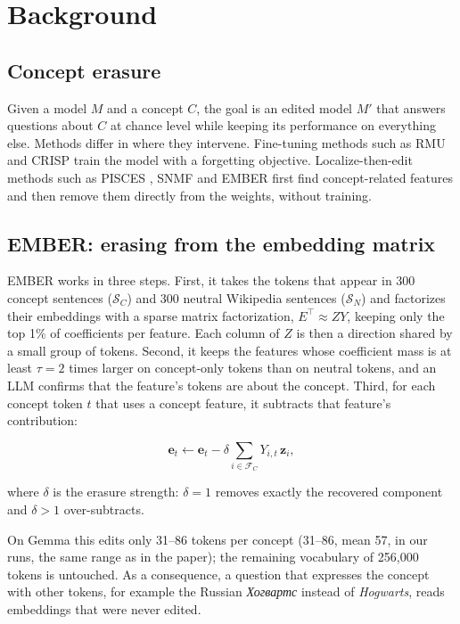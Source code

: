\documentclass[11pt]{article}
\newcommand{\cyr}[1]{{\fontencoding{T2A}\fontfamily{cmr}\selectfont #1}}
\begin{document}
\section{Background}\label{sec:2}

\subsection{Concept erasure}\label{sec:2.1}

Given a model $M$ and a concept $C$, the goal is an edited model $M'$ that answers questions about $C$ at chance level while keeping its performance on everything else. Methods differ in where they intervene. Fine-tuning methods such as RMU \citep{li2024wmdp} and CRISP \citep{ashuach2026crisp} train the model with a forgetting objective. Localize-then-edit methods such as PISCES \citep{gurarieh2025precise}, SNMF \citep{shafran2026constructing} and EMBER \citep{suslik2026ember} first find concept-related features and then remove them directly from the weights, without training.

\subsection{EMBER: erasing from the embedding matrix}\label{sec:2.2}

EMBER works in three steps. First, it takes the tokens that appear in 300 concept sentences ($\mathcal{S}_C$) and 300 neutral Wikipedia sentences ($\mathcal{S}_N$) and factorizes their embeddings with a sparse matrix factorization, $E^{\top}\approx ZY$, keeping only the top 1\% of coefficients per feature. Each column of $Z$ is then a direction shared by a small group of tokens. Second, it keeps the features whose coefficient mass is at least $\tau=2$ times larger on concept-only tokens than on neutral tokens, and an LLM confirms that the feature's tokens are about the concept. Third, for each concept token $t$ that uses a concept feature, it subtracts that feature's contribution:

\begin{equation*}
\mathbf{e}_t \leftarrow \mathbf{e}_t - \delta \sum_{i \in \mathcal{F}_C} Y_{i,t}\,\mathbf{z}_i,
\end{equation*}

where $\delta$ is the erasure strength: $\delta = 1$ removes exactly the recovered component and $\delta > 1$ over-subtracts.

On Gemma this edits only 31--86 tokens per concept (31--86, mean 57, in our runs, the same range as in the paper); the remaining vocabulary of 256,000 tokens is untouched. As a consequence, a question that expresses the concept with other tokens, for example the Russian \emph{\cyr{Хогвартс}} instead of \emph{Hogwarts}, reads embeddings that were never edited.
\end{document}
